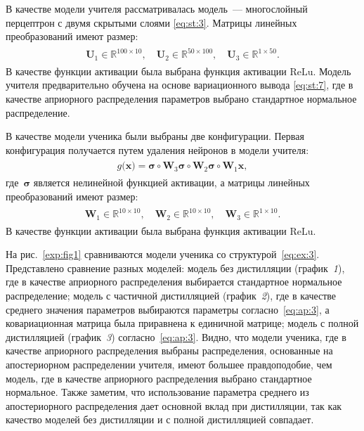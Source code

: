 \documentclass[12pt]{a&t}
\begin{document}
В качестве модели учителя рассматривалась модель~--- многослойный перцептрон с двумя скрытыми слоями \eqref{eq:st:3}. Матрицы линейных преобразований имеют размер:
\begin{gather}
\label{eq:ex:2}
\begin{aligned}
\mathbf{U}_{1} \in \mathbb{R}^{100 \times 10}, \quad \mathbf{U}_{2} \in \mathbb{R}^{50 \times 100}, \quad \mathbf{U}_{3} \in \mathbb{R}^{1 \times 50}.
\end{aligned}
\end{gather}
В качестве функции активации была выбрана функция активации $\text{ReLu}$.
Модель учителя предварительно обучена на основе вариационного вывода \eqref{eq:st:7}, где в качестве априорного распределения параметров выбрано стандартное нормальное распределение.

В качестве модели ученика были выбраны две конфигурации. Первая конфигурация получается путем удаления нейронов в модели учителя:
\begin{gather}
\label{eq:ex:3}
\begin{aligned}
g\bigr(\mathbf{x}\bigr) = \bm{\sigma} \circ \mathbf{W}_3\bm{\sigma} \circ \mathbf{W}_2\bm{\sigma} \circ \mathbf{W}_1\mathbf{x},
\end{aligned}
\end{gather}
где~$\bm{\sigma}$ является нелинейной функцией активации, а матрицы линейных преобразований имеют размер:
\begin{gather}
\label{eq:ex:4}
\begin{aligned}
\mathbf{W}_{1} \in \mathbb{R}^{10 \times 10}, \quad \mathbf{W}_{2} \in \mathbb{R}^{10 \times 10},  \quad \mathbf{W}_{3} \in \mathbb{R}^{1 \times 10}.
\end{aligned}
\end{gather}
В качестве функции активации была выбрана функция активации $\text{ReLu}$.



На рис.~\ref{exp:fig1} сравниваются модели ученика со структурой~\eqref{eq:ex:3}.
Представлено сравнение разных моделей: модель без дистилляции (график~\textit{1}), где в качестве априорного распределения выбирается стандартное нормальное распределение; модель с частичной дистилляцией (график~\textit{2}), где в качестве среднего значения параметров выбираются параметры согласно~\eqref{eq:ap:3}, а ковариационная матрица была приравнена к единичной матрице; модель с полной дистилляцией (график~\textit{3}) согласно~\eqref{eq:ap:3}.
Видно, что модели ученика, где в качестве априорного распределения выбраны распределения, основанные на апостериорном распределении учителя, имеют большее правдоподобие, чем модель, где в качестве априорного распределения выбрано стандартное нормальное. 
Также заметим, что использование параметра среднего из апостериорного распределения дает основной вклад при дистилляции, так как качество моделей без дистилляции и с полной дистилляцией совпадает.
\end{document}
